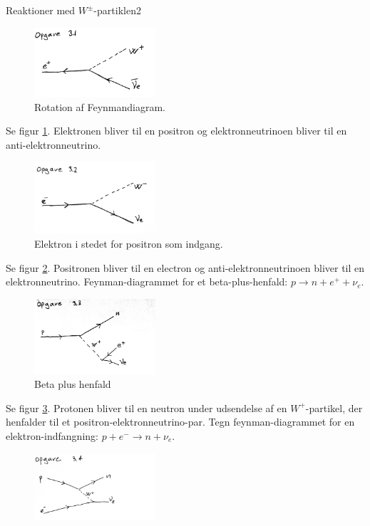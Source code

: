 \begin{opgave}{Reaktioner med $W^\pm$-partiklen}{2}
\label{opg:W}
\opg
\begin{figure}[h]
  \centering
  \includegraphics[width=0.4\textwidth]{KernePartikel/opg31.png}
  \caption{Rotation af Feynmandiagram.}
  \label{fig:opg31}
\end{figure}
Se figur \ref{fig:opg31}.
\bigskip
Elektronen bliver til en positron og elektronneutrinoen bliver til en anti-elektronneutrino.
\opg
\begin{figure}[h]
  \centering
  \includegraphics[width=0.4\textwidth]{KernePartikel/opg32.png}
  \caption{Elektron i stedet for positron som indgang.}
  \label{fig:opg32}
\end{figure}
Se figur \ref{fig:opg32}.
\bigskip
Positronen bliver til en electron og anti-elektronneutrinoen bliver til en elektronneutrino.
\opg Feynman-diagrammet for et beta-plus-henfald: $p \rightarrow
n + e^+ + \nu_e$.
\begin{figure}[h]
  \centering
  \includegraphics[width=0.4\textwidth]{KernePartikel/opg33.png}
  \caption{Beta plus henfald}
  \label{fig:opg33}
\end{figure}
Se figur \ref{fig:opg33}.
\bigskip
Protonen bliver til en neutron under udsendelse af en $W^+$-partikel, der henfalder til et positron-elektronneutrino-par.
\opg Tegn feynman-diagrammet for en elektron-indfangning: $p + e^-
\rightarrow n + \nu_e$.
\begin{figure}[h]
  \centering
  \includegraphics[width=0.4\textwidth]{KernePartikel/opg34.png}

\end{figure}
\end{opgave}
